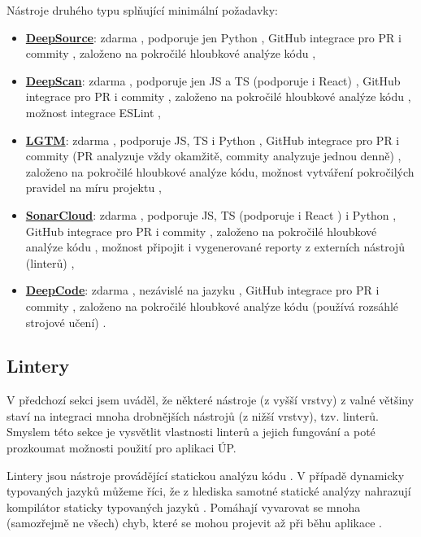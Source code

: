 Nástroje druhého typu splňující minimální požadavky:
\begin{itemize}
    \item \href{https://deepsource.io/}{\textbf{DeepSource}}: zdarma \cite{deepsource}, podporuje jen Python \cite{deepsource}, GitHub integrace pro PR i commity \cite{deepsource-docs}, založeno na pokročilé hloubkové analýze kódu \cite{deepsource2},
    \item \href{https://deepscan.io}{\textbf{DeepScan}}: zdarma \cite{deepscan-pricing}, podporuje jen JS a TS (podporuje i React) \cite{deepscan}, GitHub integrace pro PR i commity \cite{deepscan}, založeno na pokročilé hloubkové analýze kódu \cite{deepscan}, možnost integrace ESLint \cite{deepscan-eslint},
    \item \href{https://lgtm.com}{\textbf{LGTM}}: zdarma \cite{lgtm}, podporuje JS, TS i Python \cite{lgtm-faq}, GitHub integrace pro PR i commity (PR analyzuje vždy okamžitě, commity analyzuje jednou denně) \cite{lgtm-faq}, založeno na pokročilé hloubkové analýze kódu, možnost vytváření pokročilých pravidel na míru projektu \cite{lgtm},
    \item \href{https://sonarcloud.io/}{\textbf{SonarCloud}}: zdarma \cite{sonarcloud}, podporuje JS, TS (podporuje i React \cite{sonarcloud-js}) i Python \cite{sonarcloud}, GitHub integrace pro PR i commity \cite{sonarcloud-gh}, založeno na pokročilé hloubkové analýze kódu \cite{sonarcloud2}, možnost připojit i vygenerované reporty z externích nástrojů (linterů) \cite{sonarcloud-engines},
    \item \href{https://www.deepcode.ai/}{\textbf{DeepCode}}: zdarma \cite{deepcode}, nezávislé na jazyku \cite{deepsource2}, GitHub integrace pro PR i commity \cite{deepcode}, založeno na pokročilé hloubkové analýze kódu (používá rozsáhlé strojové učení) \cite{deepcode2}.
\end{itemize}

\subsection{Lintery}\label{subsec:lintery}

V předchozí sekci jsem uváděl, že některé nástroje (z vyšší vrstvy) z valné většiny staví na integraci mnoha drobnějších nástrojů (z nižší vrstvy), tzv. linterů. Smyslem této sekce je vysvětlit vlastnosti linterů a jejich fungování a poté prozkoumat možnosti použití pro aplikaci ÚP. 

Lintery jsou nástroje provádějící statickou analýzu kódu \cite{linter-medium1}. V případě dynamicky typovaných jazyků můžeme říci, že z hlediska samotné statické analýzy nahrazují kompilátor staticky typovaných jazyků \cite{linter-medium1}. Pomáhají vyvarovat se mnoha (samozřejmě ne všech) chyb, které se mohou projevit až při běhu aplikace \cite{linter-medium1}.

